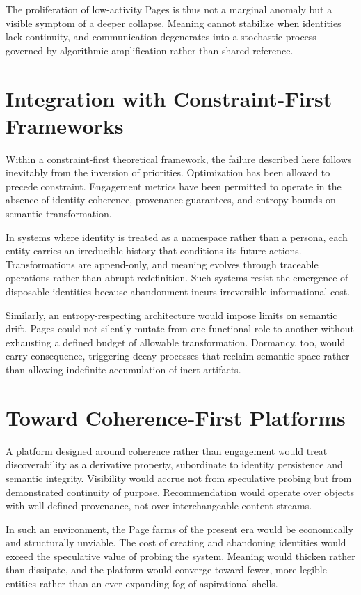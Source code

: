 \documentclass[11pt,oneside]{article}
\begin{document}
The proliferation of low-activity Pages is thus not a marginal anomaly but a visible symptom of a deeper collapse. Meaning cannot stabilize when identities lack continuity, and communication degenerates into a stochastic process governed by algorithmic amplification rather than shared reference.

\section{Integration with Constraint-First Frameworks}

Within a constraint-first theoretical framework, the failure described here follows inevitably from the inversion of priorities. Optimization has been allowed to precede constraint. Engagement metrics have been permitted to operate in the absence of identity coherence, provenance guarantees, and entropy bounds on semantic transformation.

In systems where identity is treated as a namespace rather than a persona, each entity carries an irreducible history that conditions its future actions. Transformations are append-only, and meaning evolves through traceable operations rather than abrupt redefinition. Such systems resist the emergence of disposable identities because abandonment incurs irreversible informational cost.

Similarly, an entropy-respecting architecture would impose limits on semantic drift. Pages could not silently mutate from one functional role to another without exhausting a defined budget of allowable transformation. Dormancy, too, would carry consequence, triggering decay processes that reclaim semantic space rather than allowing indefinite accumulation of inert artifacts.

\section{Toward Coherence-First Platforms}

A platform designed around coherence rather than engagement would treat discoverability as a derivative property, subordinate to identity persistence and semantic integrity. Visibility would accrue not from speculative probing but from demonstrated continuity of purpose. Recommendation would operate over objects with well-defined provenance, not over interchangeable content streams.

In such an environment, the Page farms of the present era would be economically and structurally unviable. The cost of creating and abandoning identities would exceed the speculative value of probing the system. Meaning would thicken rather than dissipate, and the platform would converge toward fewer, more legible entities rather than an ever-expanding fog of aspirational shells.
\end{document}
